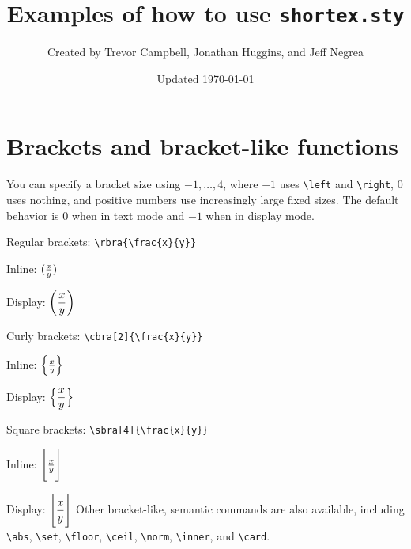 \documentclass{article}
\title{Examples of how to use \texttt{shortex.sty}}
\author{Created by Trevor Campbell, Jonathan Huggins, and Jeff Negrea}
\date{Updated \today}
\begin{document}
\maketitle

\section{Brackets and bracket-like functions}

You can specify a bracket size using $-1,\dots,4$, where $-1$ uses \verb!\left! and \verb!\right!, 
$0$ uses nothing, and positive numbers use increasingly large fixed sizes. 
The default behavior is $0$ when in text mode
and $-1$ when in display mode.

\bitems
\item Regular brackets:  \verb!\rbra{\frac{x}{y}}!
    \bitems
    \item Inline: $\rbra{\frac{x}{y}}$ 
    \item Display: $\displaystyle\rbra{\frac{x}{y}}$
    \eitems
\item Curly brackets: \verb!\cbra[2]{\frac{x}{y}}!
    \bitems
    \item Inline: $\cbra[2]{\frac{x}{y}}$
    \item Display: $\displaystyle\cbra[2]{\frac{x}{y}}$
    \eitems
\item Square brackets: \verb!\sbra[4]{\frac{x}{y}}!
    \bitems
    \item Inline: $\sbra[4]{\frac{x}{y}}$
    \item Display: $\displaystyle\sbra[4]{\frac{x}{y}}$
    \eitems
\eitems
Other bracket-like, semantic commands are also available, including \verb!\abs!, \verb!\set!, \verb!\floor!, \verb!\ceil!, \verb!\norm!, \verb!\inner!, and \verb!\card!. 
\end{document}
